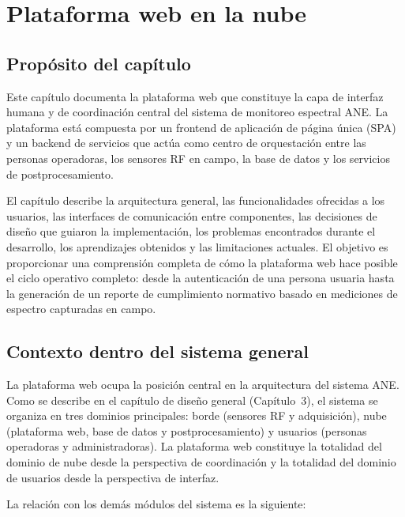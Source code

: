 \chapter{Plataforma web en la nube}

\section{Propósito del capítulo}

Este capítulo documenta la plataforma web que constituye la capa de interfaz
humana y de coordinación central del sistema de monitoreo espectral ANE. La
plataforma está compuesta por un frontend de aplicación de página única (SPA)
y un backend de servicios que actúa como centro de orquestación entre las
personas operadoras, los sensores RF en campo, la base de datos y los
servicios de postprocesamiento.

El capítulo describe la arquitectura general, las funcionalidades ofrecidas a
los usuarios, las interfaces de comunicación entre componentes, las decisiones
de diseño que guiaron la implementación, los problemas encontrados durante el
desarrollo, los aprendizajes obtenidos y las limitaciones actuales. El
objetivo es proporcionar una comprensión completa de cómo la plataforma web
hace posible el ciclo operativo completo: desde la autenticación de una
persona usuaria hasta la generación de un reporte de cumplimiento normativo
basado en mediciones de espectro capturadas en campo.

\section{Contexto dentro del sistema general}

La plataforma web ocupa la posición central en la arquitectura del sistema
ANE. Como se describe en el capítulo de diseño general (Capítulo~3), el
sistema se organiza en tres dominios principales: borde (sensores RF y
adquisición), nube (plataforma web, base de datos y postprocesamiento) y
usuarios (personas operadoras y administradoras). La plataforma web constituye
la totalidad del dominio de nube desde la perspectiva de coordinación y la
totalidad del dominio de usuarios desde la perspectiva de interfaz.

La relación con los demás módulos del sistema es la siguiente:

